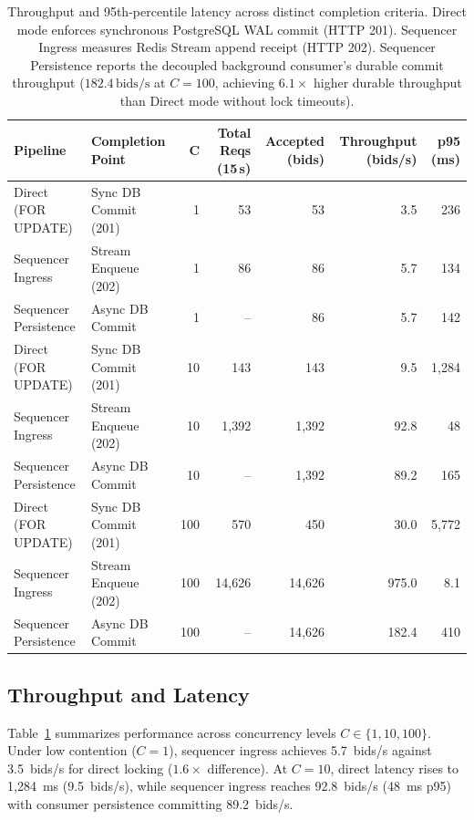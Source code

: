 \documentclass[conference]{IEEEtran}
\begin{document}
\begin{table}[t]
\centering
\small
\begin{tabular}{llrrrrr}
\toprule
\textbf{Pipeline} & \textbf{Completion Point} & \textbf{C} & \textbf{Total Reqs (15\,s)} & \textbf{Accepted (bids)} & \textbf{Throughput (bids/s)} & \textbf{p95 (ms)} \\
\midrule
Direct (FOR UPDATE)       & Sync DB Commit (201) & 1   & 53       & 53      & 3.5    & 236    \\
Sequencer Ingress         & Stream Enqueue (202) & 1   & 86       & 86      & 5.7    & 134    \\
Sequencer Persistence     & Async DB Commit      & 1   & --       & 86      & 5.7    & 142    \\
\midrule
Direct (FOR UPDATE)       & Sync DB Commit (201) & 10  & 143      & 143     & 9.5    & 1{,}284 \\
Sequencer Ingress         & Stream Enqueue (202) & 10  & 1{,}392  & 1{,}392 & 92.8   & 48     \\
Sequencer Persistence     & Async DB Commit      & 10  & --       & 1{,}392 & 89.2   & 165    \\
\midrule
Direct (FOR UPDATE)       & Sync DB Commit (201) & 100 & 570      & 450     & 30.0   & 5{,}772 \\
Sequencer Ingress         & Stream Enqueue (202) & 100 & 14{,}626 & 14{,}626& 975.0  & 8.1    \\
Sequencer Persistence     & Async DB Commit      & 100 & --       & 14{,}626& 182.4  & 410    \\
\bottomrule
\end{tabular}
\caption{Throughput and 95th-percentile latency across distinct completion criteria. Direct mode enforces synchronous PostgreSQL WAL commit (HTTP 201). Sequencer Ingress measures Redis Stream append receipt (HTTP 202). Sequencer Persistence reports the decoupled background consumer's durable commit throughput ($182.4\,\text{bids/s}$ at $C=100$, achieving $6.1\times$ higher durable throughput than Direct mode without lock timeouts).}
\label{tab:throughput}
\end{table}

\subsection{Throughput and Latency}
Table~\ref{tab:throughput} summarizes performance across concurrency levels $C \in \{1, 10, 100\}$.
Under low contention ($C=1$), sequencer ingress achieves 5.7~bids/s against 3.5~bids/s for direct
locking ($1.6\times$ difference). At $C=10$, direct latency rises to 1{,}284~ms (9.5~bids/s),
while sequencer ingress reaches 92.8~bids/s (48~ms p95) with consumer persistence committing 89.2~bids/s.
\end{document}
